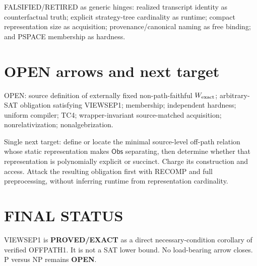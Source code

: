 \documentclass[11pt]{article}
\begin{document}
FALSIFIED/RETIRED as generic hinges: realized transcript identity as counterfactual truth; explicit strategy-tree cardinality as runtime; compact representation size as acquisition; provenance/canonical naming as free binding; and PSPACE membership as hardness.

\section*{OPEN arrows and next target}
OPEN: source definition of externally fixed non-path-faithful $W_{\rm exact}$; arbitrary-SAT obligation satisfying VIEWSEP1; membership; independent hardness; uniform compiler; TC4; wrapper-invariant source-matched acquisition; nonrelativization; nonalgebrization.

Single next target: define or locate the minimal source-level off-path relation whose static representation makes $\mathsf{Obs}$ separating, then determine whether that representation is polynomially explicit or succinct. Charge its construction and access. Attack the resulting obligation first with RECOMP and full preprocessing, without inferring runtime from representation cardinality.

\section*{FINAL STATUS}
VIEWSEP1 is \textbf{PROVED/EXACT} as a direct necessary-condition corollary of verified OFFPATH1. It is not a SAT lower bound. No load-bearing arrow closes. P versus NP remains \textbf{OPEN}.

\end{document}

